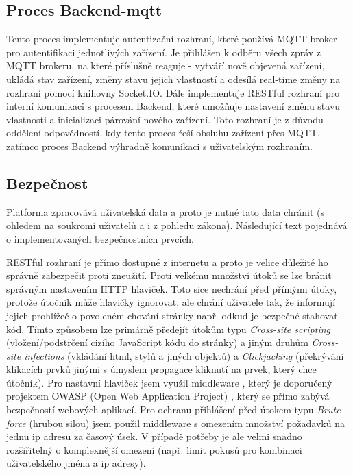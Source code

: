 \subsection{Proces Backend-mqtt}
Tento proces implementuje autentizační rozhraní, které používá MQTT broker pro autentifikaci jednotlivých zařízení. Je přihlášen k odběru všech zpráv z MQTT brokeru, na které příslušně reaguje - vytváří nově objevená zařízení, ukládá stav zařízení, změny stavu jejich vlastností a odesílá real-time změny na rozhraní pomocí knihovny Socket.IO. Dále implementuje RESTful rozhraní pro interní komunikaci s procesem Backend, které umožňuje nastavení změnu stavu vlastnosti a inicializaci párování nového zařízení. Toto rozhraní je z důvodu oddělení odpovědností, kdy tento proces řeší obsluhu zařízení přes MQTT, zatímco proces Backend výhradně komunikaci s uživatelským rozhraním.


\subsection{Bezpečnost}
Platforma zpracovává uživatelská data a proto je nutné tato data chránit (s ohledem na soukromí uživatelů a i z pohledu zákona). Následující text pojednává o implementovaných bezpečnostních prvcích.

RESTful rozhraní je přímo dostupné z internetu a proto je velice důležité ho správně zabezpečit proti zneužití. Proti velkému množství útoků se lze bránit správným nastavením HTTP hlaviček. Toto sice nechrání před přímými útoky, protože útočník může hlavičky ignorovat, ale chrání uživatele tak, že informují jejich prohlížeč o povoleném chování stránky např. odkud je bezpečné stahovat kód. Tímto způsobem lze primárně předejít útokům typu \textit{Cross-site scripting} (vložení/podstrčení cizího JavaScript kódu do stránky) a jiným druhům \textit{Cross-site infections} (vkládání html, stylů a jiných objektů) a \textit{Clickjacking} (překrývání klikacích prvků jinými s úmyslem propagace kliknutí na prvek, který chce útočník). Pro nastavní hlaviček jsem využil middleware , který je doporučený projektem OWASP (Open Web Application Project) \cite{owasp-cheatsheets}, který se přímo zabývá bezpečností webových aplikací. Pro ochranu přihlášení před útokem typu \textit{Brute-force} (hrubou silou) jsem použil middleware  s omezením množství požadavků na jednu ip adresu za časový úsek. V případě potřeby je ale velmi snadno rozšiřitelný o komplexnější omezení (např. limit pokusů pro kombinaci uživatelského jména a ip adresy).


